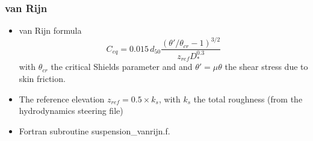 \subsubsection{van Rijn}
\begin{itemize}
\item van Rijn formula~\cite{vanRijn84b} 
\begin{equation*}
C_{eq} =0.015\,d_{50}\frac{\left(\theta'/\theta_{cr}-1\right)^{3/2}}{z_{ref}D_*^{0.3}}
\end{equation*}
with $\theta_{cr}$ the critical Shields parameter and and $\theta'= \mu\theta$ the shear stress due to skin friction.
\item The reference elevation $z_{ref}=0.5 \times k_s$, with $k_s$ the total roughness (from the hydrodynamics steering file)
\item Fortran subroutine {\ttfamily suspension\_vanrijn.f}.
\end{itemize}

